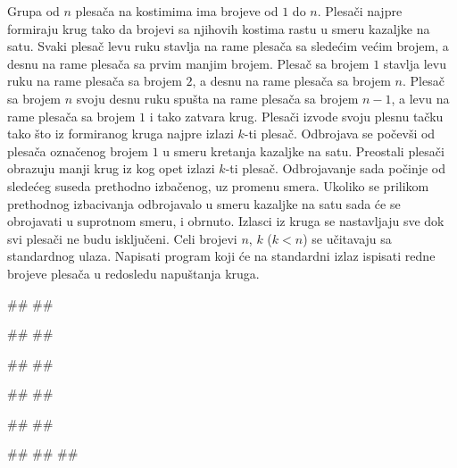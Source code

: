\begin{Exercise}[difficulty=1,label=613]
Grupa od $n$ plesača na kostimima ima brojeve od $1$ do $n$. 
Plesači najpre formiraju krug tako da brojevi sa njihovih kostima rastu u smeru kazaljke na satu. Svaki plesač levu ruku stavlja na rame plesača sa sledećim većim brojem, a desnu na rame plesača sa prvim manjim brojem. Plesač sa brojem $1$ stavlja levu ruku na rame plesača sa brojem $2$, a desnu na rame plesača sa brojem $n$. Plesač sa brojem $n$ svoju desnu ruku spušta na rame plesača sa brojem $n-1$, a levu na rame plesača sa brojem $1$ i tako zatvara krug.
Plesači izvode svoju plesnu tačku tako što iz formiranog kruga najpre izlazi $k$-ti plesač.
Odbrojava se počevši od plesača označenog brojem $1$ u smeru kretanja kazaljke na satu. 
Preostali plesači obrazuju manji krug iz kog opet izlazi $k$-ti plesač. Odbrojavanje sada počinje od
sledećeg suseda prethodno izbačenog, uz promenu smera. Ukoliko se prilikom prethodnog izbacivanja odbrojavalo 
u smeru kazaljke na satu sada će se obrojavati u suprotnom smeru, i obrnuto. Izlasci iz kruga se nastavljaju
sve dok svi plesači ne budu isključeni. 
Celi brojevi $n$, $k$ ($k < n$) se učitavaju sa standardnog ulaza. 
Napisati program koji će na standardni izlaz ispisati redne brojeve plesača u redosledu napuštanja kruga. 

\begin{minitest}
\begin{test}{1}
#\naslovUlaz#
##

#\naslovIzlaz# 
##
\end{test}
\end{minitest}
\begin{minitest}
\begin{test}{2}
#\naslovUlaz#
##

#\naslovIzlaz# 
## 
\end{test}
\end{minitest}
\begin{minitest}
\begin{test}{3}
#\naslovUlaz#
##

#\naslovIzlazZaGresku# 
##
##
\end{test}
\end{minitest}
\end{Exercise}

